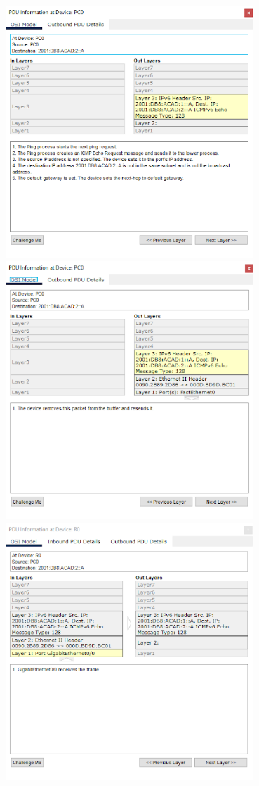 \documentclass[12pt]{article}
\begin{document}
 \includegraphics[width=0.7\textwidth]{../tpipv6/imagenes/imagen1}
 \includegraphics[width=0.7\textwidth]{../tpipv6/imagenes/imagen2}
 \includegraphics[width=0.7\textwidth]{../tpipv6/imagenes/imagen3}
\end{document}
